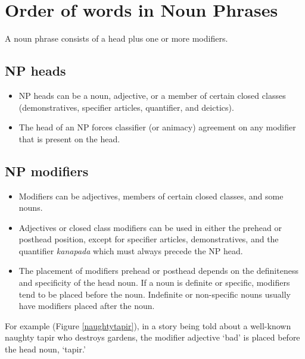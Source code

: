 \documentclass[12pt]{article}
\begin{document}
\section{Order of words in Noun Phrases}
A noun phrase consists of a head plus one or more modifiers.

  \subsection{NP heads}
  \begin{itemize}
    \item NP heads can be a noun, adjective, or a member of certain closed classes (demonstratives, specifier articles, quantifier, and deictics).
    \item The head of an NP forces classifier (or animacy) agreement on any modifier that is present on the head. %
  \end{itemize}
  \subsection{NP modifiers}
  \begin{itemize}
    \item Modifiers can be adjectives, members of certain closed classes, and some nouns.
    \item Adjectives or closed class modifiers can be used in either the prehead or posthead position, except for specifier articles, demonstratives, and the quantifier \textit{kanapada} which must always precede the NP head.
    \item The placement of modifiers prehead or posthead depends on the definiteness and specificity of the head noun. If a noun is definite or specific, modifiers tend to be placed before the noun. Indefinite or non-specific nouns usually have modifiers placed after the noun.
  \end{itemize}
  For example (Figure \ref*{naughtytapir}), in a story being told about a well-known naughty tapir who destroys gardens, the modifier adjective `bad' is placed before the head noun, `tapir.'
\end{document}
